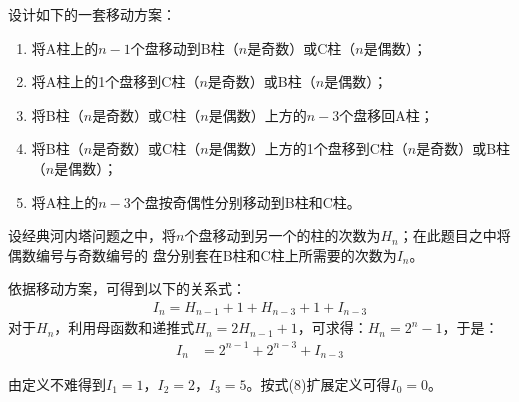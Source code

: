 \begin{solution}
    设计如下的一套移动方案：
    \begin{enumerate}
        \item 将A柱上的$n-1$个盘移动到B柱（$n$是奇数）或C柱（$n$是偶数）；
        \item 将A柱上的1个盘移到C柱（$n$是奇数）或B柱（$n$是偶数）；
        \item 将B柱（$n$是奇数）或C柱（$n$是偶数）上方的$n-3$个盘移回A柱；
        \item 将B柱（$n$是奇数）或C柱（$n$是偶数）上方的1个盘移到C柱（$n$是奇数）或B柱（$n$是偶数）；
        \item 将A柱上的$n-3$个盘按奇偶性分别移动到B柱和C柱。
    \end{enumerate}
    设经典河内塔问题之中，将$n$个盘移动到另一个的柱的次数为$H_n$；在此题目之中将偶数编号与奇数编号的
    盘分别套在B柱和C柱上所需要的次数为$I_n$。

    依据移动方案，可得到以下的关系式：
    \begin{align*}
        I_n = H_{n-1} + 1 + H_{n-3} + 1 + I_{n-3}
    \end{align*}
    对于$H_n$，利用母函数和递推式$H_n = 2H_{n-1} + 1$，可求得：$H_n = 2^n-1$，于是：
    \begin{align}
        I_n &= 2^{n-1} + 2^{n-3} + I_{n-3} %
    \end{align}

    由定义不难得到$I_1=1$，$I_2=2$，$I_3=5$。按式(8)扩展定义可得$I_0=0$。



\end{solution}
